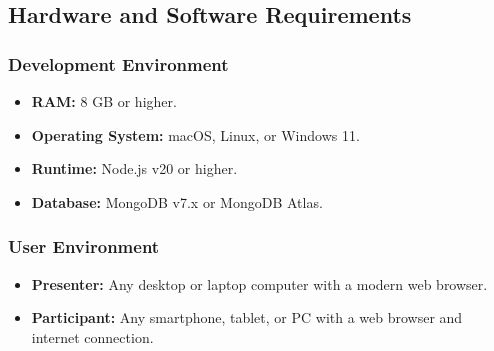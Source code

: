 \subsection{Hardware and Software Requirements}

\subsubsection{Development Environment}
\begin{itemize}
    \item \textbf{RAM:} 8 GB or higher.
    \item \textbf{Operating System:} macOS, Linux, or Windows 11.
    \item \textbf{Runtime:} Node.js v20 or higher.
    \item \textbf{Database:} MongoDB v7.x or MongoDB Atlas.
\end{itemize}

\subsubsection{User Environment}
\begin{itemize}
    \item \textbf{Presenter:} Any desktop or laptop computer with a modern web browser.
    \item \textbf{Participant:} Any smartphone, tablet, or PC with a web browser and internet connection.
\end{itemize}
